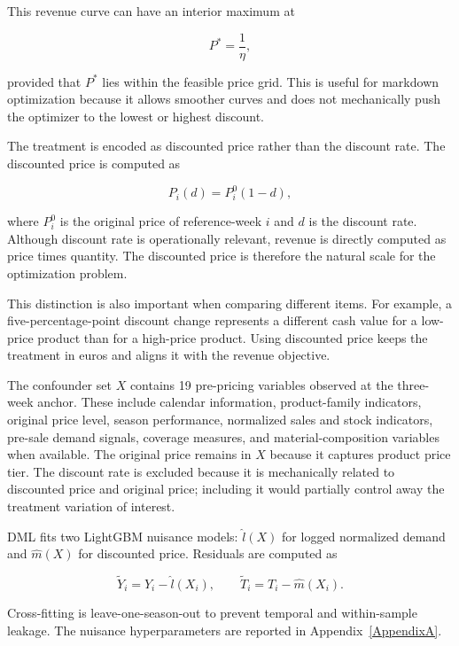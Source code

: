 This revenue curve can have an interior maximum at

\begin{equation}
P^*=\frac{1}{\eta},
\end{equation}

provided that $P^*$ lies within the feasible price grid. This is useful for markdown optimization because it allows smoother curves and does not mechanically push the optimizer to the lowest or highest discount.

The treatment is encoded as discounted price rather than the discount rate. The discounted price is computed as

\begin{equation}
P_i(d)=P_i^{0}(1-d),
\end{equation}

where $P_i^{0}$ is the original price of reference-week $i$ and $d$ is the discount rate. Although discount rate is operationally relevant, revenue is directly computed as price times quantity. The discounted price is therefore the natural scale for the optimization problem.

This distinction is also important when comparing different items. For example, a five-percentage-point discount change represents a different cash value for a low-price product than for a high-price product. Using discounted price keeps the treatment in euros and aligns it with the revenue objective.

The confounder set $X$ contains 19 pre-pricing variables observed at the three-week anchor. These include calendar information, product-family indicators, original price level, season performance, normalized sales and stock indicators, pre-sale demand signals, coverage measures, and material-composition variables when available. The original price remains in $X$ because it captures product price tier. The discount rate is excluded because it is mechanically related to discounted price and original price; including it would partially control away the treatment variation of interest.

DML fits two LightGBM nuisance models: $\hat{l}(X)$ for logged normalized demand and $\hat{m}(X)$ for discounted price. Residuals are computed as

\begin{equation}
\tilde{Y}_i = Y_i - \hat{l}(X_i),
\qquad
\tilde{T}_i = T_i - \hat{m}(X_i).
\end{equation}

Cross-fitting is leave-one-season-out to prevent temporal and within-sample leakage. The nuisance hyperparameters are reported in Appendix~\ref{AppendixA}.

